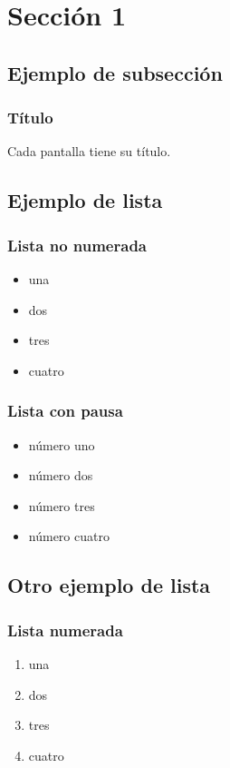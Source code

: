 \documentclass{beamer}
\begin{document}
\section{Sección 1} 
\subsection{Ejemplo de subsección}
\begin{frame}
\frametitle{Título} 
Cada pantalla tiene su título.
\end{frame}

\subsection{Ejemplo de lista}

\begin{frame}
\frametitle{Lista no numerada}
\begin{itemize}
\item una  
\item dos 
\item tres 
\item cuatro
\end{itemize} 
\end{frame}

\begin{frame}
\frametitle{Lista con pausa}
\begin{itemize}
\item número uno \pause 
\item número dos \pause 
\item número tres \pause 
\item número cuatro
\end{itemize} 
\end{frame}

\subsection{Otro ejemplo de lista}
\begin{frame}
\frametitle{Lista numerada}
\begin{enumerate}
\item una  
\item dos 
\item tres 
\item cuatro
\end{enumerate}
\end{frame}
\end{document}
